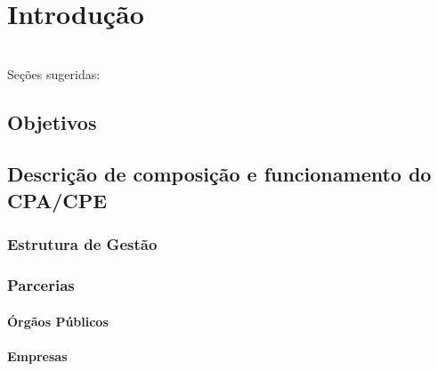 \chapter{Introdução}

\lipsum[1] \\

Seções sugeridas:

\section{Objetivos}


\section{Descrição de composição e funcionamento do CPA/CPE}

\subsection{Estrutura de Gestão}

\subsection{Parcerias}

\subsubsection{Órgãos Públicos}
\subsubsection{Empresas}

